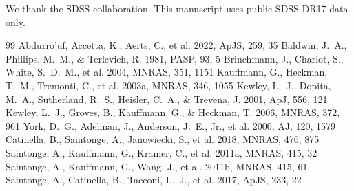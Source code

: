 \documentclass[twocolumn]{aastex702}
\begin{document}
\begin{acknowledgments}
We thank the SDSS collaboration. This manuscript uses public SDSS DR17 data only.
\end{acknowledgments}
\begin{thebibliography}{99}
 Abdurro'uf, Accetta, K., Aerts, C., et al. 2022, ApJS, 259, 35
 Baldwin, J.~A., Phillips, M.~M., \& Terlevich, R. 1981, PASP, 93, 5
 Brinchmann, J., Charlot, S., White, S.~D.~M., et al. 2004, MNRAS, 351, 1151
 Kauffmann, G., Heckman, T.~M., Tremonti, C., et al. 2003a, MNRAS, 346, 1055
 Kewley, L.~J., Dopita, M.~A., Sutherland, R.~S., Heisler, C.~A., \& Trevena, J. 2001, ApJ, 556, 121
 Kewley, L.~J., Groves, B., Kauffmann, G., \& Heckman, T. 2006, MNRAS, 372, 961
 York, D.~G., Adelman, J., Anderson, J.~E., Jr., et al. 2000, AJ, 120, 1579
 Catinella, B., Saintonge, A., Janowiecki, S., et al. 2018, MNRAS, 476, 875
 Saintonge, A., Kauffmann, G., Kramer, C., et al. 2011a, MNRAS, 415, 32
 Saintonge, A., Kauffmann, G., Wang, J., et al. 2011b, MNRAS, 415, 61
 Saintonge, A., Catinella, B., Tacconi, L.~J., et al. 2017, ApJS, 233, 22
\end{thebibliography}
\end{document}
